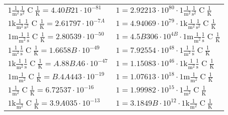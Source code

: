\begin{center}
\begin{longtable}{l l}
{\color{black}$1 \bm{\mathrm{ }}\frac1{\operatorname{m}^2}\frac1{\operatorname{s}^2}{\operatorname{C}}\frac1{\operatorname{K}} = 4.40B21\cdot10^{-81} $}   & {\color{black}$ 1 = 2.92213\cdot10^{80} \cdot 1 \bm{\mathrm{ }}\frac1{\operatorname{m}^2}\frac1{\operatorname{s}^2}{\operatorname{C}}\frac1{\operatorname{K}}$}  \\
{\color{gray}$1 \bm{\mathrm{ k}}\frac1{\operatorname{m}^2}\frac1{\operatorname{s}^2}{\operatorname{C}}\frac1{\operatorname{K}} = 2.61797\cdot10^{-7A} $}   & {\color{gray}$ 1 = 4.94069\cdot10^{79} \cdot 1 \bm{\mathrm{ k}}\frac1{\operatorname{m}^2}\frac1{\operatorname{s}^2}{\operatorname{C}}\frac1{\operatorname{K}}$}  \\
{\color{gray}$1 \bm{\mathrm{ m}}\frac1{\operatorname{m}^2}\frac1{\operatorname{s}}{\operatorname{C}}\frac1{\operatorname{K}} = 2.80539\cdot10^{-50} $}   & {\color{gray}$ 1 = 4.5B306\cdot10^{4B} \cdot 1 \bm{\mathrm{ m}}\frac1{\operatorname{m}^2}\frac1{\operatorname{s}}{\operatorname{C}}\frac1{\operatorname{K}}$}  \\
{\color{black}$1 \bm{\mathrm{ }}\frac1{\operatorname{m}^2}\frac1{\operatorname{s}}{\operatorname{C}}\frac1{\operatorname{K}} = 1.6658B\cdot10^{-49} $}   & {\color{black}$ 1 = 7.92554\cdot10^{48} \cdot 1 \bm{\mathrm{ }}\frac1{\operatorname{m}^2}\frac1{\operatorname{s}}{\operatorname{C}}\frac1{\operatorname{K}}$}  \\
{\color{gray}$1 \bm{\mathrm{ k}}\frac1{\operatorname{m}^2}\frac1{\operatorname{s}}{\operatorname{C}}\frac1{\operatorname{K}} = A.88BA6\cdot10^{-47} $}   & {\color{gray}$ 1 = 1.15083\cdot10^{46} \cdot 1 \bm{\mathrm{ k}}\frac1{\operatorname{m}^2}\frac1{\operatorname{s}}{\operatorname{C}}\frac1{\operatorname{K}}$}  \\
{\color{gray}$1 \bm{\mathrm{ m}}\frac1{\operatorname{m}^2}{}{\operatorname{C}}\frac1{\operatorname{K}} = B.4A443\cdot10^{-19} $}   & {\color{gray}$ 1 = 1.07613\cdot10^{18} \cdot 1 \bm{\mathrm{ m}}\frac1{\operatorname{m}^2}{}{\operatorname{C}}\frac1{\operatorname{K}}$}  \\
{\color{black}$1 \bm{\mathrm{ }}\frac1{\operatorname{m}^2}{}{\operatorname{C}}\frac1{\operatorname{K}} = 6.72537\cdot10^{-16} $}   & {\color{black}$ 1 = 1.99982\cdot10^{15} \cdot 1 \bm{\mathrm{ }}\frac1{\operatorname{m}^2}{}{\operatorname{C}}\frac1{\operatorname{K}}$}  \\
{\color{gray}$1 \bm{\mathrm{ k}}\frac1{\operatorname{m}^2}{}{\operatorname{C}}\frac1{\operatorname{K}} = 3.9A035\cdot10^{-13} $}   & {\color{gray}$ 1 = 3.1849B\cdot10^{12} \cdot 1 \bm{\mathrm{ k}}\frac1{\operatorname{m}^2}{}{\operatorname{C}}\frac1{\operatorname{K}}$}  \\

\end{longtable}
\end{center}
